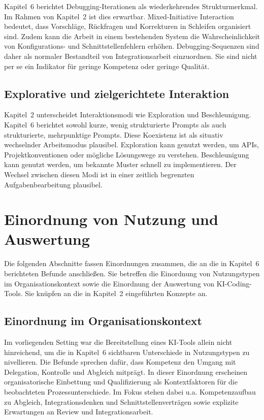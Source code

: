 Kapitel~6 berichtet Debugging-Iterationen als wiederkehrendes Strukturmerkmal.
Im Rahmen von Kapitel~2 ist dies erwartbar.
Mixed-Initiative Interaction bedeutet, dass Vorschl\"age, R\"uckfragen und Korrekturen in Schleifen organisiert sind.
Zudem kann die Arbeit in einem bestehenden System die Wahrscheinlichkeit von Konfigurations- und Schnittstellenfehlern erh\"ohen.
Debugging-Sequenzen sind daher als normaler Bestandteil von Integrationsarbeit einzuordnen.
Sie sind nicht per se ein Indikator f\"ur geringe Kompetenz oder geringe Qualit\"at.

\subsection{Explorative und zielgerichtete Interaktion}
\label{sec:discussion_exploration_vs_acceleration}

Kapitel~2 unterscheidet Interaktionsmodi wie Exploration und Beschleunigung.
Kapitel~6 berichtet sowohl kurze, wenig strukturierte Prompts als auch strukturierte, mehrpunktige Prompts.
Diese Koexistenz ist als situativ wechselnder Arbeitsmodus plausibel.
Exploration kann genutzt werden, um APIs, Projektkonventionen oder m\"ogliche L\"osungswege zu verstehen.
Beschleunigung kann genutzt werden, um bekannte Muster schnell zu implementieren.
Der Wechsel zwischen diesen Modi ist in einer zeitlich begrenzten Aufgabenbearbeitung plausibel.

\section{Einordnung von Nutzung und Auswertung}
\label{sec:discussion_usage_and_evaluation}

Die folgenden Abschnitte fassen Einordnungen zusammen, die an die in Kapitel~6 berichteten Befunde anschlie\ss en.
Sie betreffen die Einordnung von Nutzungstypen im Organisationskontext sowie die Einordnung der Auswertung von KI-Coding-Tools.
Sie kn\"upfen an die in Kapitel~2 eingef\"uhrten Konzepte an.

\subsection{Einordnung im Organisationskontext}
\label{sec:discussion_org_context}

Im vorliegenden Setting war die Bereitstellung eines KI-Tools allein nicht hinreichend, um die in Kapitel~6 sichtbaren Unterschiede in Nutzungstypen zu nivellieren.
Die Befunde sprechen daf\"ur, dass Kompetenz den Umgang mit Delegation, Kontrolle und Abgleich mitpr\"agt.
In dieser Einordnung erscheinen organisatorische Einbettung und Qualifizierung als Kontextfaktoren f\"ur die beobachteten Prozessunterschiede.
Im Fokus stehen dabei u.a. Kompetenzaufbau zu Abgleich, Integrationsdenken und Schnittstellenvertr\"agen sowie explizite Erwartungen an Review und Integrationsarbeit.

